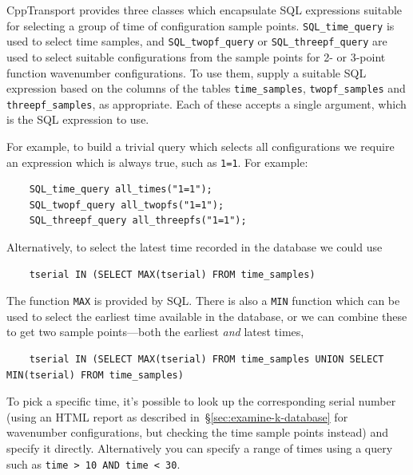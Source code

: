 \documentclass[11pt,a4paper]{article}
\newcommand{\packagefont}{\sffamily}
\newcommand{\CppTransport}{{\packagefont CppTransport}}
\newcommand{\semibold}[1]{{\fontseries{b}\selectfont{#1}}}
\newcommand{\para}[1]{\par\vspace{2mm}\noindent\semibold{{#1.}---}\ignorespaces}
\begin{document}
{\CppTransport} provides three classes which encapsulate SQL expressions suitable
for selecting a group of time of configuration sample points.
\texttt{SQL_time_query} is used to select time samples,
and
\texttt{SQL_twopf_query}
or \texttt{SQL_threepf_query}
are used to select suitable configurations from the sample points
for 2- or 3-point function wavenumber configurations.
To use them, supply a suitable SQL expression based on the columns
of the tables
\texttt{time_samples},
\texttt{twopf_samples}
and
\texttt{threepf_samples},
as appropriate.
Each of these accepts a single argument, which is the SQL
expression to use.

\para{Selecting times}
For example, to build a trivial query which selects all configurations
we require an expression which is always true, such as
\texttt{1=1}.
For example:
\begin{verbatim}
	SQL_time_query all_times("1=1");
	SQL_twopf_query all_twopfs("1=1");
	SQL_threepf_query all_threepfs("1=1");	
\end{verbatim}
Alternatively, to select the latest time recorded in the database
we could use
\begin{verbatim}
	tserial IN (SELECT MAX(tserial) FROM time_samples)
\end{verbatim}
The function \texttt{MAX} is provided by SQL.
There is also a \texttt{MIN} function which can be used to select
the earliest time available in the database,
or we can combine these to get two sample points---both the earliest \emph{and}
latest times,
\begin{verbatim}
	tserial IN (SELECT MAX(tserial) FROM time_samples UNION SELECT MIN(tserial) FROM time_samples)
\end{verbatim}
To pick a specific time, it's possible to look up the corresponding serial
number (using an HTML report as described in~\S\ref{sec:examine-k-database}
for wavenumber configurations, but checking the time sample points instead)
and specify it directly.
Alternatively you can specify a range of times using a query such as
\texttt{time > 10 AND time < 30}.
\end{document}
